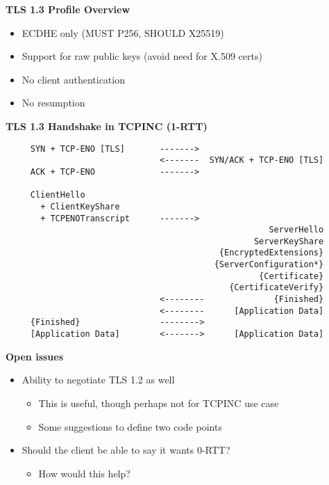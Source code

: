 \documentclass[helvetica]{seminar}
\newcommand{\heading}[1]{%
  \begin{center} 
    \large\bf 
    #1 
  \end{center} 
  \vspace{.4 in}}
\begin{document}
\begin{slide}
\heading{TLS 1.3 Profile Overview}

\begin{itemize}
\item ECDHE only (MUST P256, SHOULD X25519)
\item Support for raw public keys (avoid need for X.509 certs)
\item No client authentication
\item No resumption
\end{itemize}
\end{slide}

\begin{slide}
\heading{TLS 1.3 Handshake in TCPINC (1-RTT)}

\begin{scriptsize}
\begin{verbatim}
     SYN + TCP-ENO [TLS]       ------->
                               <-------  SYN/ACK + TCP-ENO [TLS]
     ACK + TCP-ENO             ------->

     ClientHello
       + ClientKeyShare
       + TCPENOTranscript      ------->
                                                     ServerHello
                                                  ServerKeyShare
                                           {EncryptedExtensions}
                                          {ServerConfiguration*}
                                                   {Certificate}
                                             {CertificateVerify}
                               <--------              {Finished}
                               <--------      [Application Data]
     {Finished}                -------->
     [Application Data]        <------->      [Application Data]
\end{verbatim}
\end{scriptsize}


\end{slide}


\begin{slide}
\heading{Open issues}

\begin{itemize}
\item Ability to negotiate TLS 1.2 as well
  \begin{itemize}
  \item This is useful, though perhaps not for TCPINC use case
  \item Some suggestions to define two code points
  \end{itemize}

\item Should the client be able to say it wants 0-RTT?
  \begin{itemize}
  \item How would this help?
  \end{itemize}
\end{itemize}

\end{slide}
\end{document}
